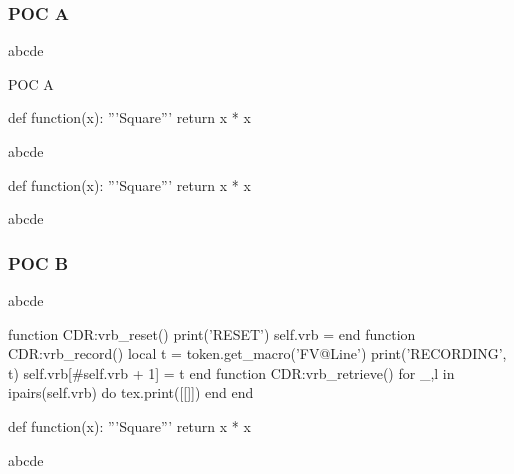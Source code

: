 \subsubsection{POC A}
\bgroup
abcde
\makeatletter
\def\FVB@POCCodeBoxA {
  \@bsphack
  \FV@VerbatimBegin
  \FV@Scan
}
\def\FVE@POCCodeBoxA {
  \FV@VerbatimEnd
  \@esphack
}
\makeatother
\begin{codebox}{POC A}
\begin{POCCodeBoxA}
def function(x):
  '''Square'''
  return x * x
\end{POCCodeBoxA}
\end{codebox}
abcde
\begin{POCCodeBoxA}
def function(x):
  '''Square'''
  return x * x
\end{POCCodeBoxA}
abcde
\egroup
\subsubsection{POC B}
\bgroup
abcde
\makeatletter
\begin{luacode}
  function CDR:vrb_reset()
    print('RESET')
    self.vrb = {}
  end
  function CDR:vrb_record()
    local t = token.get_macro('FV@Line')
    print('RECORDING', t)
    self.vrb[\string#self.vrb + 1] = t
  end
  function CDR:vrb_retrieve()
    for _,l in ipairs(self.vrb) do
      tex.print([[\string\CDR@Line\string{]]..l..[[\string}]])
    end
  end
\end{luacode}
\ExplSyntaxOn
\def\CDR@Line#1{\CDR_line_box:nnn { } {#1} { } }
\def\FVB@POCCodeBoxB {
  \@bsphack
  \group_begin:
  \directlua{CDR:vrb_reset()}
  \cs_set:Npn \FV@ProcessLine ##1 {
    \directlua{CDR.vrb_record(CDR)}
  }
  \FV@Scan
}
\def\FVE@POCCodeBoxB {
  \codebox{POC B}
  \fvset{commandchars=\\\{\}}
  \FV@VerbatimBegin
  \makeatletter
  \directlua{CDR.vrb_retrieve(CDR)}
  \makeatother
  \cs_set_eq:NN \FV@ProcessLine \use:n
  \FV@VerbatimEnd
  \endcodebox
  \group_end:
  \@esphack
}
\ExplSyntaxOff
{}
\makeatother
\begin{POCCodeBoxB}
def function(x):
  '''Square'''
  return x * x
\end{POCCodeBoxB}
abcde
\egroup
